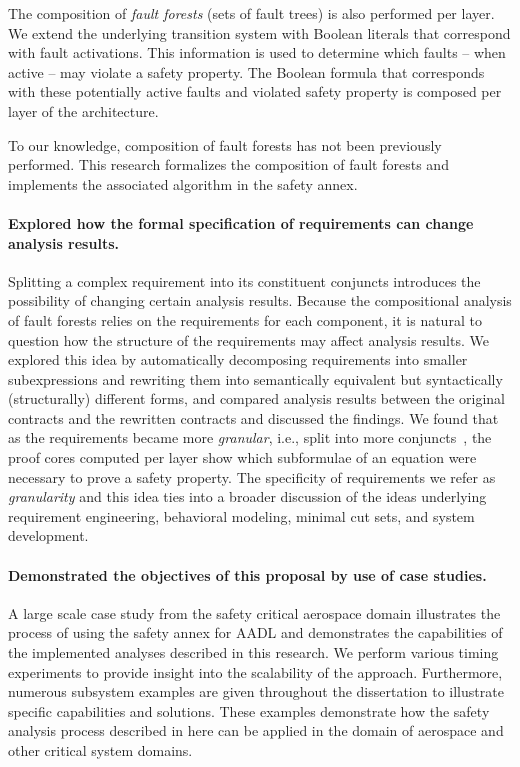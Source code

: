 The composition of {\em fault forests} (sets of fault trees) is also performed per layer. We extend the underlying transition system with Boolean literals that correspond with fault activations. This information is used to determine which faults -- when active -- may violate a safety property. The Boolean formula that corresponds with these potentially active faults and violated safety property is composed per layer of the architecture.

To our knowledge, composition of fault forests has not been previously performed. This research formalizes the composition of fault forests and implements the associated algorithm in the safety annex.

\paragraph{Explored how the formal specification of requirements can change analysis results.}
Splitting a complex requirement into its constituent conjuncts introduces the possibility of changing certain analysis results. Because the compositional analysis of fault forests relies on the requirements for each component, it is natural to question how the structure of the requirements may affect analysis results. We explored this idea by automatically decomposing requirements into smaller subexpressions and rewriting them into semantically equivalent but syntactically (structurally) different forms, and compared analysis results between the original contracts and the rewritten contracts and discussed the findings. We found that as the requirements became more \emph{granular}, i.e., split into more conjuncts~\cite{ghassabani_2018}, the proof cores computed per layer show which subformulae of an equation were necessary to prove a safety property. The specificity of requirements we refer as \emph{granularity} and this idea ties into a broader discussion of the ideas underlying requirement engineering, behavioral modeling, minimal cut sets, and system development. 

\paragraph{Demonstrated the objectives of this proposal by use of case studies.}
A large scale case study from the safety critical aerospace domain illustrates the process of using the safety annex for AADL and demonstrates the capabilities of the implemented analyses described in this research. We perform various timing experiments to provide insight into the scalability of the approach. Furthermore, numerous subsystem examples are given throughout the dissertation to illustrate specific capabilities and solutions. These examples demonstrate how the safety analysis process described in here can be applied in the domain of aerospace and other critical system domains. \\


